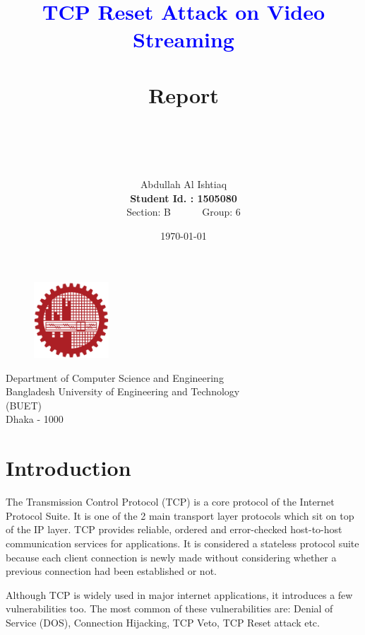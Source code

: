 \documentclass[14pt]{extarticle}
\title{\Huge{\textcolor{blue}{TCP Reset Attack on Video Streaming}} \\ ~\\
        \LARGE{Report} \\ ~ \\ ~ \\ }
\author{Abdullah Al Ishtiaq \\
        \textbf{Student Id. : 1505080} \\ 
        Section: B ~~~~~ Group: 6}
\date{\today}
\begin{document}
\maketitle

\vspace{1cm}

\begin{figure}[h!]
\centering
    \includegraphics[width = 0.25\textwidth]{Pictures/logoBUET.png}
\end{figure}
\begin{center}
\vspace{.5cm}

\Large{Department of Computer Science and Engineering \\
    Bangladesh University of Engineering and Technology \\
    (BUET) \\
    Dhaka - 1000 }

\end{center}

\newpage

\tableofcontents

\vspace{3 cm}

\listoffigures
\newpage


\section{Introduction}
    The Transmission Control Protocol (TCP) is a core protocol of the Internet Protocol Suite. It is one of the 2 main transport layer protocols which sit on top of the IP layer. TCP provides reliable, ordered and error-checked host-to-host communication services for applications. It is considered a stateless protocol suite because each client connection is newly made without considering whether a previous connection had been established or not. 
    
    Although TCP is widely used in major internet applications, it introduces a few vulnerabilities too. The most common of these vulnerabilities are: Denial of Service (DOS), Connection Hijacking, TCP Veto, TCP Reset attack etc.
\end{document}
